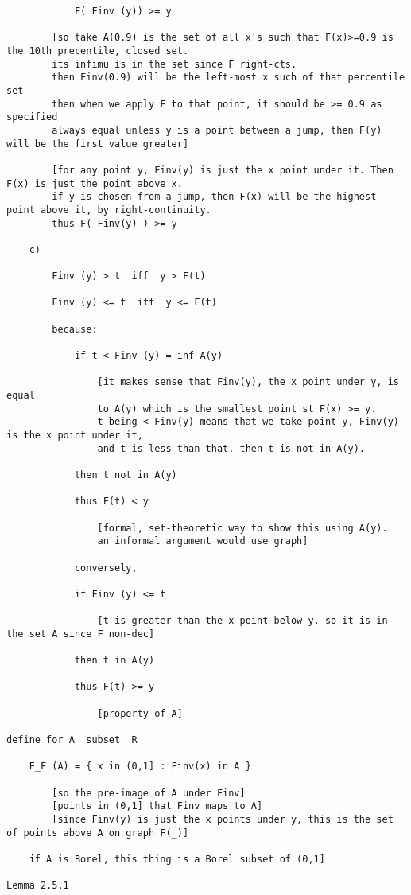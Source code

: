 \documentclass{article}
\begin{document}
\begin{flushleft}
\begin{verbatim}
			F( Finv (y)) >= y
		
		[so take A(0.9) is the set of all x's such that F(x)>=0.9 is the 10th precentile, closed set.
		its infimu is in the set since F right-cts.
		then Finv(0.9) will be the left-most x such of that percentile set
		then when we apply F to that point, it should be >= 0.9 as specified
		always equal unless y is a point between a jump, then F(y) will be the first value greater]
		
		[for any point y, Finv(y) is just the x point under it. Then F(x) is just the point above x.
		if y is chosen from a jump, then F(x) will be the highest point above it, by right-continuity.
		thus F( Finv(y) ) >= y
		
	c) 
	
		Finv (y) > t  iff  y > F(t)
		
		Finv (y) <= t  iff  y <= F(t)			
		
		because:
		
			if t < Finv (y) = inf A(y)
			
				[it makes sense that Finv(y), the x point under y, is equal 
				to A(y) which is the smallest point st F(x) >= y.
				t being < Finv(y) means that we take point y, Finv(y) is the x point under it,
				and t is less than that. then t is not in A(y).
			
			then t not in A(y)
		 
		 	thus F(t) < y
		 	
		 		[formal, set-theoretic way to show this using A(y). 
		 		an informal argument would use graph]
		 		
		 	conversely, 
		 	
		 	if Finv (y) <= t
		 	
		 		[t is greater than the x point below y. so it is in the set A since F non-dec]
		 	
		 	then t in A(y)
		 	
		 	thus F(t) >= y
		 	
		 		[property of A]
		 		
define for A  subset  R

	E_F (A) = { x in (0,1] : Finv(x) in A }
	
		[so the pre-image of A under Finv]
		[points in (0,1] that Finv maps to A]
		[since Finv(y) is just the x points under y, this is the set of points above A on graph F(_)]
	
	if A is Borel, this thing is a Borel subset of (0,1]
	
Lemma 2.5.1 


\end{verbatim}
\end{flushleft}
\end{document}
